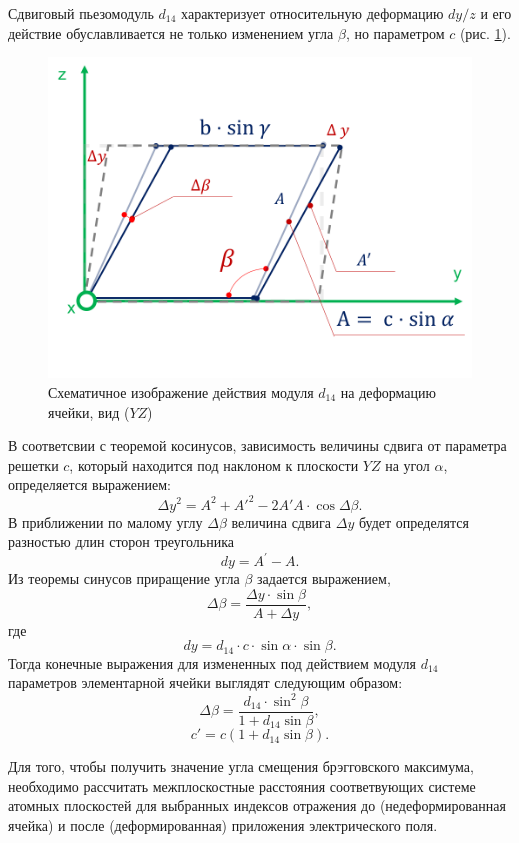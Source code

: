 Сдвиговый пьезомодуль $d_{14}$ характеризует относительную деформацию $dy/z$ и
его действие обуславливается не только
изменением угла $\beta$, но параметром $c$ (рис. \ref{ris:d14}).
\begin{figure}[H]
  \centering
  \includegraphics[width=.6\textwidth]{images/d14.png}
  \caption{Схематичное изображение действия модуля $d_{14}$ на деформацию ячейки, вид ($YZ$)}
  \label{ris:d14}
\end{figure}
В соответсвии с теоремой косинусов, зависимость величины сдвига от параметра решетки $c$,
который находится под наклоном к плоскости $YZ$ на угол $\alpha$, определяется выражением:
$$
    \Delta y^2 = A^2 + A{'}^2 - 2 A{'}A \cdot \cos \Delta \beta.
$$
В приближении по малому углу $\Delta \beta$ величина сдвига $\Delta y$ будет
определятся разностью длин сторон треугольника
$$
  dy = A^{'} - A.
$$
Из теоремы синусов приращение угла $\beta$ задается выражением,
$$
\Delta \beta = \frac{\Delta y \cdot\sin \beta}{ A+ \Delta y },
$$
\noindent
где
$$
dy = d_{14} \cdot c \cdot \sin \alpha \cdot \sin \beta.
$$
Тогда конечные выражения для измененных под действием модуля $d_{14}$ параметров элементарной ячейки
выглядят следующим образом:
\begin{equation}
   \Delta \beta = \frac{d_{14} \cdot \sin^2\beta}{1+d_{14}\sin \beta},
   \label{eq:b_formed_5}
\end{equation}
\begin{equation}
   c{'} = c(1+d_{14}\sin\beta).
   \label{eq:b_formed_6}
\end{equation}

Для того, чтобы получить значение угла смещения брэгговского максимума,
необходимо рассчитать межплоскостные расстояния соответвующих системе атомных плоскостей
 для выбранных индексов отражения
до (недеформированная ячейка) и после (деформированная) приложения электрического
поля.

